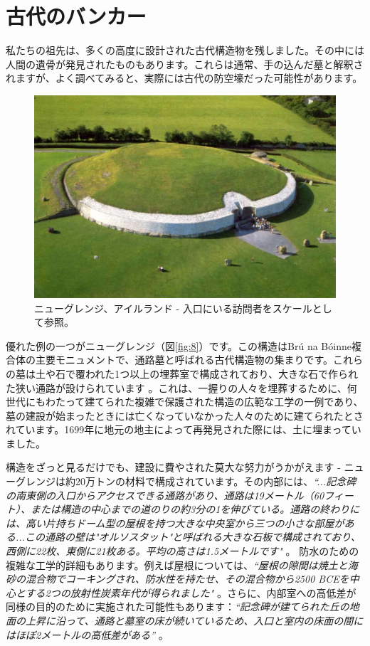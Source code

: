 \documentclass[10pt,twocolumn,letterpaper]{article}
\begin{document}
\section{古代のバンカー}
私たちの祖先は、多くの高度に設計された古代構造物を残しました。その中には人間の遺骨が発見されたものもあります。これらは通常、手の込んだ墓と解釈されますが、よく調べてみると、実際には古代の防空壕だった可能性があります。

\begin{figure}[b]
\begin{center}
   \includegraphics[width=1\linewidth]{ww19.jpg}
\end{center}
   \caption{ニューグレンジ、アイルランド - 入口にいる訪問者をスケールとして参照。}
\label{fig:8}
\label{fig:onecol}
\end{figure}

優れた例の一つがニューグレンジ（図\ref{fig:8}）です。この構造はBrú na Bóinne複合体の主要モニュメントで、通路墓と呼ばれる古代構造物の集まりです。これらの墓は土や石で覆われた1つ以上の埋葬室で構成されており、大きな石で作られた狭い通路が設けられています \cite{70}。これは、一握りの人々を埋葬するために、何世代にもわたって建てられた複雑で保護された構造の広範な工学の一例であり、墓の建設が始まったときには亡くなっていなかった人々のために建てられたとされています。1699年に地元の地主によって再発見された際には、土に埋まっていました。

構造をざっと見るだけでも、建設に費やされた莫大な努力がうかがえます - ニューグレンジは約20万トンの材料で構成されています。その内部には、\textit{“...記念碑の南東側の入口からアクセスできる通路があり、通路は19メートル（60フィート）、または構造の中心までの道のりの約3分の1を伸びている。通路の終わりには、高い片持ちドーム型の屋根を持つ大きな中央室から三つの小さな部屋がある...この通路の壁は"オルソスタット"と呼ばれる大きな石板で構成されており、西側に22枚、東側に21枚ある。平均の高さは1.5メートルです" } \cite{70}。 防水のための複雑な工学的詳細もあります。例えば屋根については、\textit{“屋根の隙間は焼土と海砂の混合物でコーキングされ、防水性を持たせ、その混合物から2500 BCEを中心とする2つの放射性炭素年代が得られました" } \cite{71}。さらに、内部室への高低差が同様の目的のために実施された可能性もあります：\textit{“記念碑が建てられた丘の地面の上昇に沿って、通路と墓室の床が続いているため、入口と室内の床面の間にはほぼ2メートルの高低差がある”} \cite{71}。
\end{document}
